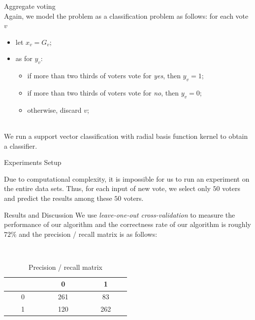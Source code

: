 \documentclass[final]{beamer}
\newlength{\onecolwid}
\begin{document}
\begin{frame}[t]
\begin{columns}[t]
\begin{column}{\onecolwid}
\begin{block}{Aggregate voting}
    \quad \\
    
    Again, we model the problem as a classification problem as follows: for each vote $v$
    \begin{itemize}
        \item let $x_v = G_v$;
        \item as for $y_v$:
            \begin{itemize}
                \item if more than two thirds of voters vote for {\em yes}, then $y_v = 1$;
                \item if more than two thirds of voters vote for {\em no}, then $y_v = 0$;
                \item otherwise, discard $v$;
            \end{itemize}
    \end{itemize}
    
    \quad \\
 
    We run a support vector classification with radial basis function kernel to obtain a classifier.

\end{block}


\begin{block}{Experiments Setup}
    
    Due to computational complexity, it is impossible for us to run an experiment on the entire data sets. Thus, for each input of new vote, we select only $50$ voters and predict the results among these $50$ voters. 

\end{block}

\begin{block}{Results and Discussion}
    We use {\em leave-one-out cross-validation} to measure the performance of our algorithm and the correctness rate of our algorithm is roughly $72\%$ and the precision / recall matrix is as follows:
    
    \quad \\
    
    \begin{table}
        \centering
        \begin{tabular}{|c|c|c|}
            \hline
              & ~~~~0~~~~ & ~~~~1~~~~ \\
            \hline
            ~~~~0~~~~ & 261 & 83 \\
            \hline
            ~~~~1~~~~ & 120 & 262 \\
            \hline
        \end{tabular}
        \caption{Precision / recall matrix}
    \end{table}
    

\end{block}
\end{column}
\end{columns}
\end{frame}
\end{document}
